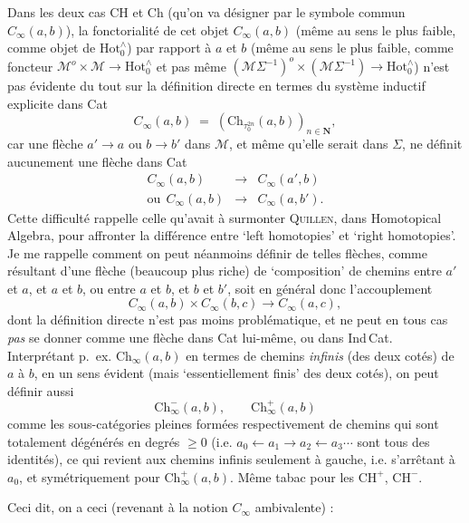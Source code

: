 \documentclass[11pt]{article}
\newcommand{\printedpage}[1]{\marginpar{\footnotesize p.~#1}}
\newcommand{\msp}[1]{\marginpar{\footnotesize [#1]}}
\newcommand{\HotO}{\mathrm{Hot}_0^{\wedge}}
\begin{document}
\msp{page 11}
Dans les deux cas CH et Ch (qu'on va désigner par le symbole commun $C_{\infty}(a,b)$), la fonctorialité de cet objet $C_{\infty}(a,b)$ (même au sens le plus faible, comme objet de $\HotO$) par rapport à $a$ et $b$ (même au sens le plus faible, comme foncteur $\mathcal{M}^o\times\mathcal{M}\longrightarrow\HotO$ et pas même $(\mathcal{M}\Sigma^{-1})^o\times(\mathcal{M}\Sigma^{-1})\longrightarrow\HotO$) n'est pas évidente du tout sur la définition directe en termes du système inductif explicite dans Cat
\[
C_{\infty}(a,b) \;=\; (\mathrm{Ch}_{\tau_0^{2n}}(a,b))_{n\in\mathbf{N}},
\]
car une flèche $a'\longrightarrow a$ ou $b\longrightarrow b'$ dans $\mathcal{M}$, et même qu'elle serait dans $\Sigma$, ne définit aucunement une flèche dans Cat
\[
\begin{array}{rcl}
C_{\infty}(a,b) & \longrightarrow & C_{\infty}(a',b)\\
\text{ou}\ \ C_{\infty}(a,b) & \longrightarrow & C_{\infty}(a,b').
\end{array}
\]
Cette difficulté rappelle celle qu'avait à surmonter \textsc{Quillen}, dans Homotopical Algebra, pour affronter la différence entre `left homotopies' et `right homotopies'. Je me rappelle comment
\printedpage{8}
\msp{page 12}
on peut néanmoins définir de telles flèches, comme résultant d'une flèche (beaucoup plus riche) de `composition' de chemins entre $a'$ et $a$, et $a$ et $b$, ou entre $a$ et $b$, et $b$ et $b'$, soit en général donc l'accouplement
\[
C_{\infty}(a,b)\times C_{\infty}(b,c)\longrightarrow C_{\infty}(a,c),
\]
dont la définition directe n'est pas moins problématique, et ne peut en tous cas \textit{pas} se donner comme une flèche dans Cat lui-même, ou dans Ind\,Cat. Interprétant p.~ex. $\mathrm{Ch}_{\infty}(a,b)$ en termes de chemins \textit{infinis} (des deux cotés) de $a$ à $b$, en un sens évident (mais %
`essentiellement finis' des deux cotés), on peut définir aussi %
\[
\mathrm{Ch}^{-}_{\infty}(a,b), \qquad \mathrm{Ch}^{+}_{\infty}(a,b)
\]
comme les sous-catégories pleines formées respectivement de chemins qui sont totalement dégénérés en degrés $\geq 0$ (i.e. $a_0\longleftarrow a_1\longrightarrow a_2\longleftarrow a_3\cdots$ sont tous des identités), ce qui revient aux chemins infinis seulement à gauche, i.e. s'arrêtant à $a_0$, et symétriquement pour $\mathrm{Ch}^{+}_{\infty}(a,b)$. Même tabac pour les $\mathrm{CH}^{+}$, $\mathrm{CH}^{-}$.

\msp{page 13}
Ceci dit, on a ceci (revenant à la notion $C_{\infty}$ ambivalente) :
\end{document}
